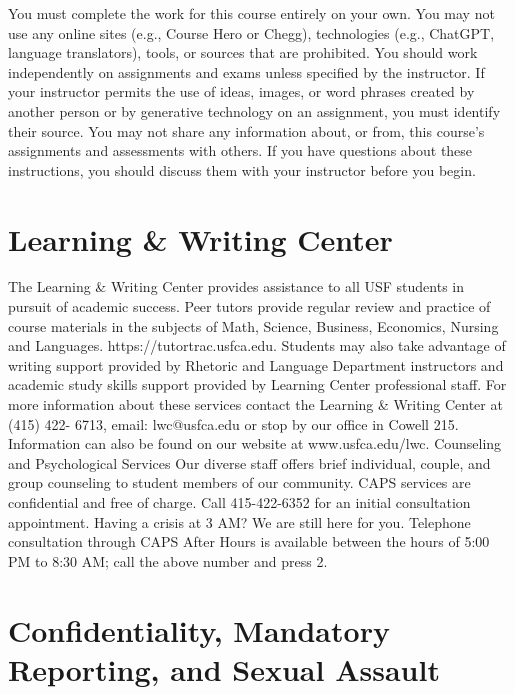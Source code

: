 \documentclass[10pt, oneside]{article}
\begin{document}
You must complete the work for this course entirely on your own. You may not use any online sites (e.g., Course Hero or Chegg), technologies (e.g., ChatGPT, language translators), tools, or sources that are prohibited. You should work independently on assignments and exams unless specified by the instructor. If your instructor permits the use of ideas, images, or word phrases created by another person or by generative technology on an assignment, you must identify their source. You may not share any information about, or from, this course's assignments and assessments with others. If you have questions about these instructions, you should discuss them with your instructor before you begin.

\section*{Learning \& Writing Center}
The Learning \& Writing Center provides assistance to all USF students in pursuit of academic success. Peer tutors provide regular review and practice of course materials in the subjects of Math, Science, Business, Economics, Nursing and Languages. https://tutortrac.usfca.edu. Students may also take advantage of writing support provided by Rhetoric and Language Department instructors and academic study skills support provided by Learning Center professional staff. For more information about these services contact the Learning \& Writing Center at (415) 422- 6713, email: lwc@usfca.edu or stop by our office in Cowell 215. Information can also be found on our website at www.usfca.edu/lwc.
Counseling and Psychological Services
Our diverse staff offers brief individual, couple, and group counseling to student members of our community. CAPS services are confidential and free of charge. Call 415-422-6352 for an initial consultation appointment. Having a crisis at 3 AM? We are still here for you. Telephone consultation through CAPS After Hours is available between the hours of 5:00 PM to 8:30 AM; call the above number and press 2.

\section*{Confidentiality, Mandatory Reporting, and Sexual Assault}
\end{document}
